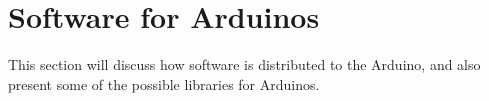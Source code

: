 \clearpage
\section{Software for Arduinos}\label{sec:software}
This section will discuss how software is distributed to the Arduino, and also present some of the possible libraries for Arduinos.

